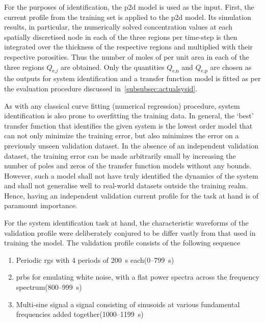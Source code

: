 
For  the  purposes  of  identification,  the \gls{p2d}  model  is  used  as  the
input.  First, the  current profile  from  the training  set is  applied to  the
\gls{p2d} model. Its  simulation results, in particular,  the numerically solved
concentration values  at each spatially  discretised node  in each of  the three
regions per  time-step is then integrated  over the thickness of  the respective
regions  and multiplied  with their  respective porosities.  Thus the  number of
moles of   per unit area in each of  the three regions $Q_{\text{e,}j}$
are obtained. Only  the quantities $Q_\text{e,n}$ and  $Q_\text{e,p}$ are chosen
as the outputs for system identification and a transfer function model is fitted
as per the evaluation procedure discussed in~\cref{subsubsec:actualsysid}.

As with  any classical  curve fitting  (numerical regression)  procedure, system
identification is also  prone to overfitting the training data.  In general, the
`best' transfer  function that identifies the  given system is the  lowest order
model that  can not  only minimize  the training error,  but also  minimizes the
error  on  a  previously  unseen  validation  dataset.  In  the  absence  of  an
independent validation dataset, the training error can be made arbitrarily small
by increasing  the number  of poles  and zeros of  the transfer  function models
without any  bounds. However, such a  model shall not have  truly identified the
dynamics of  the system  and shall  not generalise  well to  real-world datasets
outside  the training  realm. Hence,  having an  independent validation  current
profile for the task at hand is of paramount importance.

For the system identification task at  hand, the characteristic waveforms of the
validation profile were deliberately conjured to be differ vastly from that used
in training the model. The  validation profile consists of the following
sequence
\begin{enumerate}
    \item Periodic \gls{rgs} with 4 periods of \SI{200}{\second} each\quad (0--\SI{799}{\second})
    \item \gls{prbs} for emulating white noise, \ie{} with a flat power spectra
        across the frequency spectrum\quad (800--\SI{999}{\second})
    \item Multi-sine signal \ie{} a signal consisting of sinusoids at
        various fundamental frequencies added together\quad (1000--\SI{1199}{\second})
\end{enumerate}

